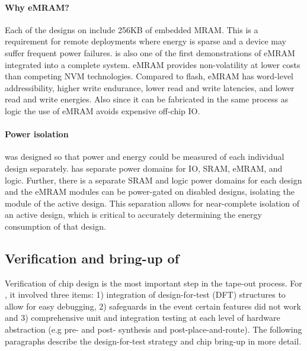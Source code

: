 \paragraph{Why eMRAM?}
Each of the designs on \msilicon include 256KB of embedded MRAM.
% 
This is a requirement for remote deployments where energy is sparse and a device may suffer frequent power failures.
% 
\msilicon is also one of the first demonstrations of eMRAM integrated into a complete system.
% 
eMRAM provides non-volatility at lower costs than competing NVM technologies.
% 
Compared to flash, eMRAM has word-level addressibility, higher write endurance, lower read and write latencies, and lower read and write energies.
% 
Also since it can be fabricated in the same process as logic the use of eMRAM avoids expensive off-chip IO.

\paragraph{Power isolation}
\msilicon was designed so that power and energy could be measured of each individual design separately.
% 
\msilicon has separate power domains for IO, SRAM, eMRAM, and logic.
% 
Further, there is a separate SRAM and logic power domains for each design and the eMRAM modules can be power-gated on disabled designs, isolating the module of the active design.
% 
This separation allows for near-complete isolation of an active design, which is critical to accurately determining the energy consumption of that design.

\subsection{Verification and bring-up of \msilicon}
Verification of chip design is the most important step in the tape-out process.
% 
% 
For \msilicon, it involved three items: 1) integration of design-for-test (DFT) structures to allow for easy debugging, 2) safeguards in the event certain features did not work and 3) comprehensive unit and integration testing at each level of hardware abstraction (e.g pre- and post- synthesis and post-place-and-route).
% 
The following paragraphs describe the design-for-test strategy and chip bring-up in more detail.


